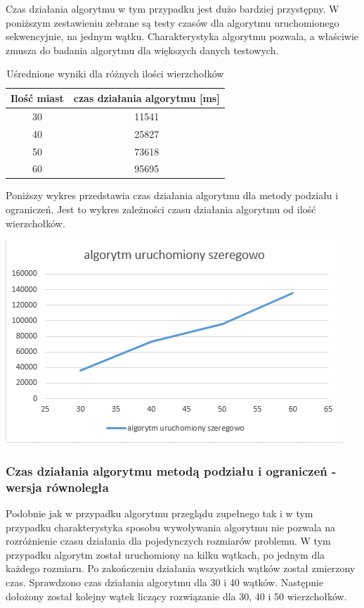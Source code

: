 \documentclass{article}
\begin{document}
		Czas działania algorytmu w tym przypadku jest dużo bardziej przystępny. W poniższym zestawieniu zebrane są testy czasów dla algorytmu uruchomionego sekwencyjnie, na jednym wątku. Charakterystyka algorytmu pozwala, a właściwie zmusza do badania algorytmu dla większych danych testowych.
	\begin{table}[H]
		\centering
		\caption{Uśrednione wyniki dla różnych ilości wierzchołków}
		\begin{tabular}{|c|c|}
			
			\hline Ilość miast  & czas działania algorytmu [ms] \\ 
			\hline  30& 11541 \\ 
			\hline  40& 25827 \\ 
			\hline  50& 73618\\ 
			\hline  60& 95695\\ 
			\hline 
		\end{tabular} 
	\end{table}
	
	Poniższy wykres przedstawia czas działania algorytmu dla metody podziału i ograniczeń. Jest to wykres zależności czasu działania algorytmu od ilość wierzchołków.

	\begin{center}
		
		\includegraphics[width=0.7\linewidth]{bbS}
		
	\end{center}
	
	\subsubsection{Czas działania algorytmu metodą podziału i ograniczeń  - wersja równoległa}
	
	Podobnie jak w przypadku algorytmu przeglądu zupełnego tak i w tym przypadku charakterystyka sposobu wywoływania algorytmu nie pozwala na rozróżnienie czasu działania dla pojedynczych rozmiarów problemu. W tym przypadku algorytm został uruchomiony na kilku wątkach, po jednym dla każdego rozmiaru. Po zakończeniu działania wszystkich wątków został zmierzony czas. Sprawdzono czas działania algorytmu dla 30 i 40 wątków. Następnie dołożony został kolejny wątek liczący rozwiązanie dla 30, 40 i 50 wierzchołków.
		\\
\end{document}
